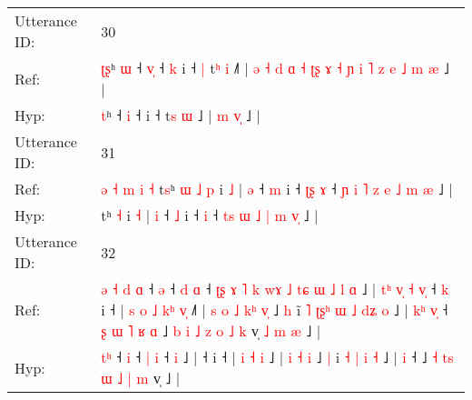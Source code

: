 \documentclass[10pt]{article}
\DeclareRobustCommand{\hl}[1]{{\textcolor{red}{#1}}}
\begin{document}
\begin{longtable}{ll}
 \\
\midrule
Utterance ID: & 30 \\
Ref: & \hl{ʈ}\hl{ʂ}ʰ\hl{ }\hl{ɯ} ˧ \hl{v}\hl{̩} ˧\hl{ }\hl{k} i ˧\hl{ }\hl{|} t\hl{ʰ} \hl{i} ˩\hl{˥} |\hl{ }\hl{ə}\hl{ }\hl{˧}\hl{ }\hl{d}\hl{ }\hl{ɑ}\hl{ }\hl{˧}\hl{ }\hl{ʈ}\hl{ʂ}\hl{ }\hl{ɤ}\hl{ }\hl{˧}\hl{ }\hl{ɲ}\hl{ }\hl{i}\hl{ }\hl{˥}\hl{ }\hl{z}\hl{ }\hl{e} \hl{˩} \hl{m}\hl{ }\hl{æ} ˩ |
 \\
Hyp: & \hl{}\hl{t}ʰ\hl{}\hl{} ˧ \hl{}\hl{i} ˧\hl{}\hl{} i ˧\hl{}\hl{} t\hl{s} \hl{ɯ} ˩\hl{} |\hl{}\hl{}\hl{}\hl{}\hl{}\hl{}\hl{}\hl{}\hl{}\hl{}\hl{}\hl{}\hl{}\hl{}\hl{}\hl{}\hl{}\hl{}\hl{}\hl{}\hl{}\hl{}\hl{}\hl{}\hl{}\hl{}\hl{} \hl{m} \hl{}\hl{v}\hl{̩} ˩ |
 \\
\midrule
Utterance ID: & 31 \\
Ref: & \hl{ə}\hl{ }\hl{˧}\hl{ }\hl{m}\hl{ }\hl{i}\hl{ }\hl{˧}\hl{ }t\hl{s}ʰ\hl{ }\hl{ɯ}\hl{ }\hl{˩} \hl{p} i \hl{˩} | \hl{ə} ˧ \hl{m} i ˧\hl{ }\hl{ʈ}\hl{ʂ} \hl{ɤ} ˧ \hl{ɲ}\hl{ }\hl{i} \hl{˥} \hl{z} \hl{e} \hl{˩} \hl{m}\hl{ }\hl{æ} ˩ |
 \\
Hyp: & \hl{}\hl{}\hl{}\hl{}\hl{}\hl{}\hl{}\hl{}\hl{}\hl{}t\hl{}ʰ\hl{}\hl{}\hl{}\hl{} \hl{˧} i \hl{˧} | \hl{i} ˧ \hl{˩} i ˧\hl{}\hl{}\hl{} \hl{i} ˧ \hl{}\hl{t}\hl{s} \hl{ɯ} \hl{˩} \hl{|} \hl{m} \hl{}\hl{v}\hl{̩} ˩ |
 \\
\midrule
Utterance ID: & 32 \\
Ref: & \hl{ə}\hl{ }\hl{˧}\hl{ }\hl{d}\hl{ }\hl{ɑ} ˧ \hl{ə} ˧ \hl{d} \hl{ɑ} ˧\hl{ }\hl{ʈ}\hl{ʂ}\hl{ }\hl{ɤ}\hl{ }\hl{˥}\hl{ }\hl{k}\hl{ }\hl{w}\hl{ɤ}\hl{ }\hl{˩}\hl{ }\hl{t}\hl{ɕ}\hl{ }\hl{ɯ}\hl{ }\hl{˩}\hl{ }\hl{l} \hl{ɑ} ˩ |\hl{ }\hl{t}\hl{ʰ}\hl{ }\hl{v}\hl{̩}\hl{ }\hl{˧}\hl{ }\hl{v}\hl{̩} ˧\hl{ }\hl{k} i ˧ |\hl{ }\hl{s}\hl{ }\hl{o} \hl{˩} \hl{k}\hl{ʰ} \hl{v}\hl{̩} ˩\hl{˥} |\hl{ }\hl{s}\hl{ }\hl{o} \hl{˩} \hl{k}\hl{ʰ} \hl{v}\hl{̩} ˩ \hl{h} i\hl{̃}\hl{ }\hl{˥}\hl{ }\hl{ʈ}\hl{ʂ}\hl{ʰ} \hl{ɯ} \hl{˩} \hl{d}\hl{ʑ} \hl{o} ˩ |\hl{ }\hl{k}\hl{ʰ} \hl{v}\hl{̩} ˧\hl{ }\hl{ʂ}\hl{ }\hl{ɯ}\hl{ }\hl{˥}\hl{ }\hl{ʁ}\hl{ }\hl{ɑ} ˩ \hl{b} \hl{i}\hl{ }\hl{˩} \hl{z} \hl{o} \hl{˩} \hl{k} v̩\hl{ }\hl{˩}\hl{ }\hl{m}\hl{ }\hl{æ} ˩ |
 \\
Hyp: & \hl{}\hl{}\hl{}\hl{}\hl{}\hl{t}\hl{ʰ} ˧ \hl{i} ˧ \hl{|} \hl{i} ˧\hl{}\hl{}\hl{}\hl{}\hl{}\hl{}\hl{}\hl{}\hl{}\hl{}\hl{}\hl{}\hl{}\hl{}\hl{}\hl{}\hl{}\hl{}\hl{}\hl{}\hl{}\hl{}\hl{} \hl{i} ˩ |\hl{}\hl{}\hl{}\hl{}\hl{}\hl{}\hl{}\hl{}\hl{}\hl{}\hl{} ˧\hl{}\hl{} i ˧ |\hl{}\hl{}\hl{}\hl{} \hl{i} \hl{}\hl{˧} \hl{}\hl{i} ˩\hl{} |\hl{}\hl{}\hl{}\hl{} \hl{i} \hl{}\hl{˧} \hl{}\hl{i} ˩ \hl{|} i\hl{}\hl{}\hl{}\hl{}\hl{}\hl{}\hl{} \hl{˧} \hl{|} \hl{}\hl{i} \hl{˧} ˩ |\hl{}\hl{}\hl{} \hl{}\hl{i} ˧\hl{}\hl{}\hl{}\hl{}\hl{}\hl{}\hl{}\hl{}\hl{}\hl{} ˩ \hl{˧} \hl{}\hl{t}\hl{s} \hl{ɯ} \hl{˩} \hl{|} \hl{m} v̩\hl{}\hl{}\hl{}\hl{}\hl{}\hl{} ˩ |

\end{longtable}
\end{document}

